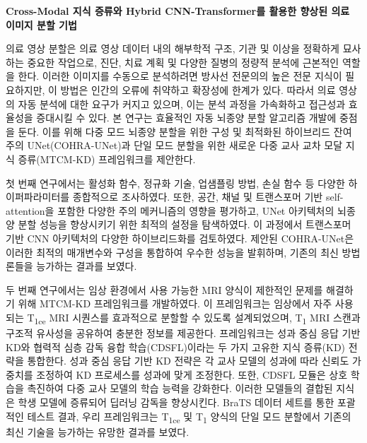 \newcommand{\thesisTitleKorean}{Cross-Modal 지식 증류와 Hybrid CNN-Transformer를 활용한 향상된 의료 이미지 분할 기법}

{\centering \Large \bf \thesisTitleKorean \par} \vspace{1.0cm}

의료 영상 분할은 의료 영상 데이터 내의 해부학적 구조, 기관 및 이상을 정확하게 묘사하는 중요한 작업으로, 진단, 치료 계획 및 다양한 질병의 정량적 분석에 근본적인 역할을 한다. 이러한 이미지를 수동으로 분석하려면 방사선 전문의의 높은 전문 지식이 필요하지만, 이 방법은 인간의 오류에 취약하고 확장성에 한계가 있다. 따라서 의료 영상의 자동 분석에 대한 요구가 커지고 있으며, 이는 분석 과정을 가속화하고 접근성과 효율성을 증대시킬 수 있다. 본 연구는 효율적인 자동 뇌종양 분할 알고리즘 개발에 중점을 둔다. 이를 위해 다중 모드 뇌종양 분할을 위한 구성 및 최적화된 하이브리드 잔여 주의 UNet(COHRA-UNet)과 단일 모드 분할을 위한 새로운 다중 교사 교차 모달 지식 증류(MTCM-KD) 프레임워크를 제안한다.

첫 번째 연구에서는 활성화 함수, 정규화 기술, 업샘플링 방법, 손실 함수 등 다양한 하이퍼파라미터를 종합적으로 조사하였다. 또한, 공간, 채널 및 트랜스포머 기반 self-attention을 포함한 다양한 주의 메커니즘의 영향을 평가하고, UNet 아키텍처의 뇌종양 분할 성능을 향상시키기 위한 최적의 설정을 탐색하였다. 이 과정에서 트랜스포머 기반 CNN 아키텍처의 다양한 하이브리드화를 검토하였다. 제안된 COHRA-UNet은 이러한 최적의 매개변수와 구성을 통합하여 우수한 성능을 발휘하며, 기존의 최신 방법론들을 능가하는 결과를 보였다.

두 번째 연구에서는 임상 환경에서 사용 가능한 MRI 양식이 제한적인 문제를 해결하기 위해 MTCM-KD 프레임워크를 개발하였다. 이 프레임워크는 임상에서 자주 사용되는 T\textsubscript{1ce} MRI 시퀀스를 효과적으로 분할할 수 있도록 설계되었으며, T\textsubscript{1} MRI 스캔과 구조적 유사성을 공유하여 충분한 정보를 제공한다. 프레임워크는 성과 중심 응답 기반 KD와 협력적 심층 감독 융합 학습(CDSFL)이라는 두 가지 고유한 지식 증류(KD) 전략을 통합한다. 성과 중심 응답 기반 KD 전략은 각 교사 모델의 성과에 따라 신뢰도 가중치를 조정하여 KD 프로세스를 성과에 맞게 조정한다. 또한, CDSFL 모듈은 상호 학습을 촉진하여 다중 교사 모델의 학습 능력을 강화한다. 이러한 모델들의 결합된 지식은 학생 모델에 증류되어 딥러닝 감독을 향상시킨다. BraTS 데이터 세트를 통한 포괄적인 테스트 결과, 우리 프레임워크는 T\textsubscript{1ce} 및 T\textsubscript{1} 양식의 단일 모드 분할에서 기존의 최신 기술을 능가하는 유망한 결과를 보였다.